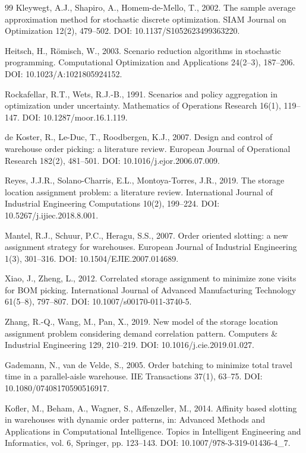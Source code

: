 \documentclass[preprint,review,11pt,authoryear]{elsarticle}
\begin{document}
\begin{thebibliography}{99}
Kleywegt, A.J., Shapiro, A., Homem-de-Mello, T., 2002. The sample average approximation method for stochastic discrete optimization. SIAM Journal on Optimization 12(2), 479--502. DOI: 10.1137/S1052623499363220.

Heitsch, H., R\"omisch, W., 2003. Scenario reduction algorithms in stochastic programming. Computational Optimization and Applications 24(2--3), 187--206. DOI: 10.1023/A:1021805924152.

Rockafellar, R.T., Wets, R.J.-B., 1991. Scenarios and policy aggregation in optimization under uncertainty. Mathematics of Operations Research 16(1), 119--147. DOI: 10.1287/moor.16.1.119.

de Koster, R., Le-Duc, T., Roodbergen, K.J., 2007. Design and control of warehouse order picking: a literature review. European Journal of Operational Research 182(2), 481--501. DOI: 10.1016/j.ejor.2006.07.009.

Reyes, J.J.R., Solano-Charris, E.L., Montoya-Torres, J.R., 2019. The storage location assignment problem: a literature review. International Journal of Industrial Engineering Computations 10(2), 199--224. DOI: 10.5267/j.ijiec.2018.8.001.

Mantel, R.J., Schuur, P.C., Heragu, S.S., 2007. Order oriented slotting: a new assignment strategy for warehouses. European Journal of Industrial Engineering 1(3), 301--316. DOI: 10.1504/EJIE.2007.014689.

Xiao, J., Zheng, L., 2012. Correlated storage assignment to minimize zone visits for BOM picking. International Journal of Advanced Manufacturing Technology 61(5--8), 797--807. DOI: 10.1007/s00170-011-3740-5.

Zhang, R.-Q., Wang, M., Pan, X., 2019. New model of the storage location assignment problem considering demand correlation pattern. Computers \& Industrial Engineering 129, 210--219. DOI: 10.1016/j.cie.2019.01.027.

Gademann, N., van de Velde, S., 2005. Order batching to minimize total travel time in a parallel-aisle warehouse. IIE Transactions 37(1), 63--75. DOI: 10.1080/07408170590516917.

Kofler, M., Beham, A., Wagner, S., Affenzeller, M., 2014. Affinity based slotting in warehouses with dynamic order patterns, in: Advanced Methods and Applications in Computational Intelligence. Topics in Intelligent Engineering and Informatics, vol. 6, Springer, pp. 123--143. DOI: 10.1007/978-3-319-01436-4\_7.

\end{thebibliography}
\end{document}
